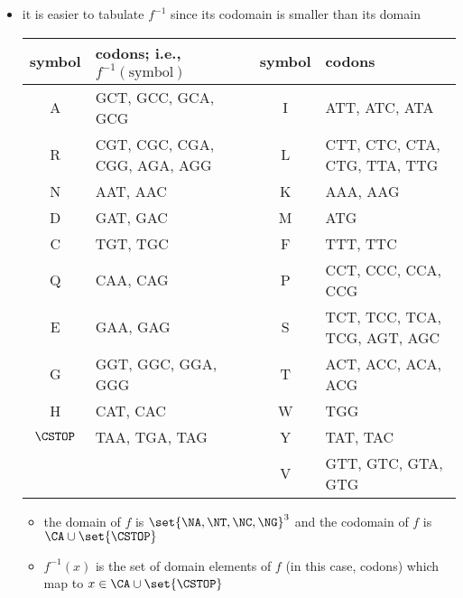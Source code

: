   \begin{itemize}
\item it is easier to tabulate $f^{-1}$ since its codomain is
  smaller than its domain
  \begin{center}
        \begin{tabular}{cl|cl}
        \toprule
        symbol & codons; i.e., $f^{-1}(\text{symbol})$ &
        symbol & codons \\
        \midrule
        A & GCT, GCC, GCA, GCG           &
        I & ATT, ATC, ATA                \\
        R & CGT, CGC, CGA, CGG, AGA, AGG &
        L & CTT, CTC, CTA, CTG, TTA, TTG \\
        N & AAT, AAC                     &
        K & AAA, AAG                     \\
        D & GAT, GAC                     &
        M & ATG                          \\
        C & TGT, TGC                     &
        F & TTT, TTC                     \\
        Q & CAA, CAG                     &
        P & CCT, CCC, CCA, CCG           \\
        E & GAA, GAG                     &
        S & TCT, TCC, TCA, TCG, AGT, AGC \\
        G & GGT, GGC, GGA, GGG           &
        T & ACT, ACC, ACA, ACG           \\
        H & CAT, CAC                     &
        W & TGG                          \\
        $\CSTOP$ & TAA, TGA, TAG         &
        Y & TAT, TAC                     \\
          &                              &
        V & GTT, GTC, GTA, GTG           \\
        \bottomrule
        \end{tabular}
      \end{center}
  \begin{itemize}
  \item the domain of $f$ is $\set{\NA, \NT, \NC, \NG}^3$ and the
      codomain of $f$ is $\CA \cup \set{\CSTOP}$
  \item $f^{-1}(x)$ is the set of domain elements of $f$ (in
      this case, codons) which map to $x \in \CA \cup \set{\CSTOP}$
  \end{itemize}
  \end{itemize}

